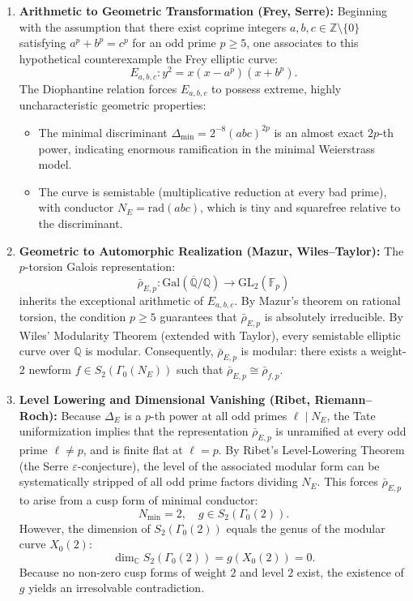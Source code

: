 \documentclass[11pt,a4paper]{article}
\theoremstyle{plain}
\theoremstyle{definition}
\theoremstyle{remark}
\newcommand{\Q}{\mathbb{Q}}
\newcommand{\Z}{\mathbb{Z}}
\newcommand{\C}{\mathbb{C}}
\newcommand{\F}{\mathbb{F}}
\newcommand{\GL}{\mathrm{GL}}
\newcommand{\Gal}{\mathrm{Gal}}
\begin{document}
\begin{enumerate}
    \item \textbf{Arithmetic to Geometric Transformation (Frey, Serre):} 
    Beginning with the assumption that there exist coprime integers $a, b, c \in \Z \setminus \{0\}$ satisfying $a^p + b^p = c^p$ for an odd prime $p \ge 5$, one associates to this hypothetical counterexample the Frey elliptic curve:
    \[
    E_{a,b,c}: y^2 = x(x - a^p)(x + b^p).
    \]
    The Diophantine relation forces $E_{a,b,c}$ to possess extreme, highly uncharacteristic geometric properties:
    \begin{itemize}
        \item The minimal discriminant $\Delta_{\min} = 2^{-8}(abc)^{2p}$ is an almost exact $2p$-th power, indicating enormous ramification in the minimal Weierstrass model.
        \item The curve is semistable (multiplicative reduction at every bad prime), with conductor $N_E = \mathrm{rad}(abc)$, which is tiny and squarefree relative to the discriminant.
    \end{itemize}

    \item \textbf{Geometric to Automorphic Realization (Mazur, Wiles--Taylor):}
    The $p$-torsion Galois representation:
    \[
    \bar{\rho}_{E,p}: \Gal(\overline{\Q}/\Q) \longrightarrow \GL_2(\F_p)
    \]
    inherits the exceptional arithmetic of $E_{a,b,c}$. By Mazur's theorem on rational torsion, the condition $p \ge 5$ guarantees that $\bar{\rho}_{E,p}$ is absolutely irreducible.
    By Wiles' Modularity Theorem (extended with Taylor), every semistable elliptic curve over $\Q$ is modular. Consequently, $\bar{\rho}_{E,p}$ is modular: there exists a weight-$2$ newform $f \in S_2(\Gamma_0(N_E))$ such that $\bar{\rho}_{E,p} \cong \bar{\rho}_{f,p}$.

    \item \textbf{Level Lowering and Dimensional Vanishing (Ribet, Riemann--Roch):}
    Because $\Delta_E$ is a $p$-th power at all odd primes $\ell \mid N_E$, the Tate uniformization implies that the representation $\bar{\rho}_{E,p}$ is unramified at every odd prime $\ell \neq p$, and is finite flat at $\ell = p$.
    By Ribet's Level-Lowering Theorem (the Serre $\varepsilon$-conjecture), the level of the associated modular form can be systematically stripped of all odd prime factors dividing $N_E$.
    This forces $\bar{\rho}_{E,p}$ to arise from a cusp form of minimal conductor:
    \[
    N_{\min} = 2, \quad g \in S_2(\Gamma_0(2)).
    \]
    However, the dimension of $S_2(\Gamma_0(2))$ equals the genus of the modular curve $X_0(2)$:
    \[
    \dim_\C S_2(\Gamma_0(2)) = g(X_0(2)) = 0.
    \]
    Because no non-zero cusp forms of weight $2$ and level $2$ exist, the existence of $g$ yields an irresolvable contradiction.
\end{enumerate}
\end{document}
